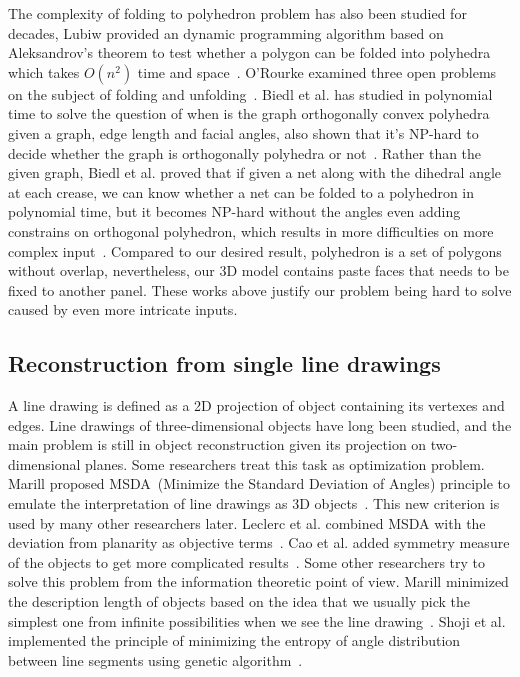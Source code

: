 The complexity of folding to polyhedron problem has also been studied for decades, Lubiw provided an dynamic programming algorithm based on Aleksandrov's theorem to test whether a polygon can be folded into polyhedra which takes $O(n^2)$ time and space~\cite{Lubiw1996When}. 
O'Rourke examined three open problems on the subject of folding and unfolding~\cite{O'Rourke:1998:FUC:646319.686376}. 
Biedl et al. has studied in polynomial time to solve the question of when is the graph orthogonally convex polyhedra given a graph, edge length and facial angles, also shown that it's NP-hard to decide whether the graph is orthogonally polyhedra or not~\cite{Biedl2004When}. Rather than the given graph, Biedl et al. proved that if given a net along with the dihedral angle at each crease, we can know whether a net can be folded to a polyhedron in polynomial time, but it becomes NP-hard without the angles even adding constrains on orthogonal polyhedron, which results in more difficulties on more complex input~\cite{Biedl:2005:NFP:1090462.1646553}.
Compared to our desired result, polyhedron is a set of polygons without overlap, nevertheless, our 3D model contains paste faces that needs to be fixed to another panel. 
These works above justify our problem being hard to solve caused by even more intricate inputs.

\subsection{Reconstruction from single line drawings} 
A line drawing is defined as a 2D projection of object containing its vertexes and edges. Line drawings of three-dimensional objects have long been studied, and the main problem is still in object reconstruction given its projection on two-dimensional planes. 
Some researchers treat this task as optimization problem. 
Marill proposed MSDA~(Minimize the Standard Deviation of Angles) principle to emulate the interpretation of line drawings as 3D objects~\cite{Marill:1991:EHI:113057.113061}. 
This new criterion is used by many other researchers later. 
Leclerc et al. combined MSDA with the deviation from planarity as objective terms~\cite{Leclerc1992An}. 
Cao et al. added symmetry measure of the objects to get more complicated results~\cite{Cao:2005:ORS:1097114.1097658}. 
Some other researchers try to solve this problem from the information theoretic point of view. 
Marill minimized the description length of objects based on the idea that we usually pick the simplest one from infinite possibilities when we see the line drawing~\cite{Marill1992Why}. 
Shoji et al. implemented the principle of minimizing the entropy of angle distribution between line segments using genetic algorithm~\cite{Shoji20013}. {}

